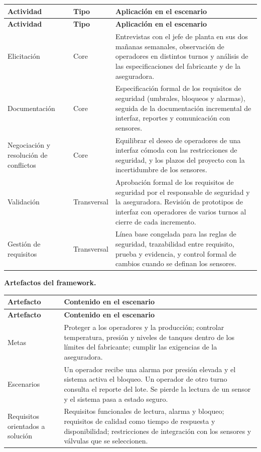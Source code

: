 {\small
\setlength{\tabcolsep}{4pt}
\renewcommand{\arraystretch}{1.3}
\begin{longtable}{
|>{\raggedright\arraybackslash}p{}
|>{\raggedright\arraybackslash}p{}
|>{\raggedright\arraybackslash}p{}|}
\hline
\textbf{Actividad} & \textbf{Tipo} & \textbf{Aplicación en el escenario} \\
\hline
\endfirsthead
\hline
\textbf{Actividad} & \textbf{Tipo} & \textbf{Aplicación en el escenario} \\
\hline
\endhead
Elicitación & Core & Entrevistas con el jefe de planta en sus dos mañanas semanales, observación de operadores en distintos turnos y análisis de las especificaciones del fabricante y de la aseguradora. \\
\hline
Documentación & Core & Especificación formal de los requisitos de seguridad (umbrales, bloqueos y alarmas), seguida de la documentación incremental de interfaz, reportes y comunicación con sensores. \\
\hline
Negociación y resolución de conflictos & Core & Equilibrar el deseo de operadores de una interfaz cómoda con las restricciones de seguridad, y los plazos del proyecto con la incertidumbre de los sensores. \\
\hline
Validación & Transversal & Aprobación formal de los requisitos de seguridad por el responsable de seguridad y la aseguradora. Revisión de prototipos de interfaz con operadores de varios turnos al cierre de cada incremento. \\
\hline
Gestión de requisitos & Transversal & Línea base congelada para las reglas de seguridad, trazabilidad entre requisito, prueba y evidencia, y control formal de cambios cuando se definan los sensores. \\
\hline
\end{longtable}
}

\textbf{Artefactos del framework.}

{\small
\setlength{\tabcolsep}{4pt}
\renewcommand{\arraystretch}{1.3}
\begin{longtable}{
|>{\raggedright\arraybackslash}p{}
|>{\raggedright\arraybackslash}p{}|}
\hline
\textbf{Artefacto} & \textbf{Contenido en el escenario} \\
\hline
\endfirsthead
\hline
\textbf{Artefacto} & \textbf{Contenido en el escenario} \\
\hline
\endhead
Metas & Proteger a los operadores y la producción; controlar temperatura, presión y niveles de tanques dentro de los límites del fabricante; cumplir las exigencias de la aseguradora. \\
\hline
Escenarios & Un operador recibe una alarma por presión elevada y el sistema activa el bloqueo. Un operador de otro turno consulta el reporte del lote. Se pierde la lectura de un sensor y el sistema pasa a estado seguro. \\
\hline
Requisitos orientados a solución & Requisitos funcionales de lectura, alarma y bloqueo; requisitos de calidad como tiempo de respuesta y disponibilidad; restricciones de integración con los sensores y válvulas que se seleccionen. \\
\hline
\end{longtable}
}

